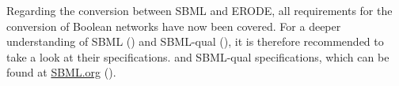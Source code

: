 Regarding the conversion between SBML and ERODE, all requirements for the conversion of Boolean networks have now been covered. For a deeper understanding of SBML (\cite{hucka2018systems}) and SBML-qual (\cite{sbmlqual2015}), it is therefore  recommended to take a look at their specifications.  and SBML-qual  specifications, which can be found at  \href{http://sbml.org/Documents/Specifications}{SBML.org} (\cite{documents/specifications}).



